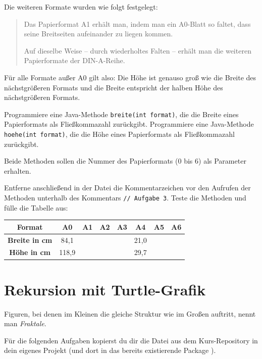 Die weiteren Formate wurden wie folgt festgelegt:

\begin{quotation}
\noindent Das Papierformat A1 erhält man, indem man ein A0-Blatt so faltet,
dass seine Breitseiten aufeinander zu liegen kommen.

\vspace{3mm}

\noindent Auf dieselbe Weise -- durch wiederholtes Falten -- erhält man die
weiteren Papierformate der DIN-A-Reihe.
\end{quotation}

Für alle Formate außer A0 gilt also: 
Die Höhe ist genauso groß wie die Breite des nächstgrößeren Formats und die
Breite entspricht der halben Höhe des nächstgrößeren Formats.

Programmiere eine Java-Methode \lstinline|breite(int format)|, die die Breite eines
Papierformats als Fließkommazahl zurückgibt. Programmiere eine Java-Methode
\lstinline|hoehe(int format)|, die die Höhe eines Papierformats als Fließkommazahl zurückgibt.

Beide Methoden sollen die Nummer des Papierformats ($0$ bis $6$) als Parameter
erhalten. 

Entferne anschließend in der Datei die Kommentarzeichen vor den Aufrufen der Methoden unterhalb des
Kommentars \glqq\lstinline|// Aufgabe 3|\grqq . Teste die Methoden und
fülle die Tabelle aus:

\bgroup
\def\arraystretch{1.2}
\begin{tabular}{|c|c|c|c|c|c|c|c|}\hline
\textbf{Format}       & \textbf{A0} & \textbf{A1} & \textbf{A2} & \textbf{A3} & \textbf{A4} & \textbf{A5} & \textbf{A6} \\ \hline
\textbf{Breite in cm} &  84,1 &  &  &  & 21,0 & & \\ \hline
\textbf{Höhe in cm}   & 118,9 &  &  &  & 29,7 & & \\ \hline
\end{tabular}
\egroup


\section{Rekursion mit Turtle-Grafik}

Figuren, bei denen im Kleinen die gleiche Struktur wie im Großen auftritt,
nennt man \emph{Fraktale}.

Für die folgenden Aufgaben kopierst du dir die Datei
 aus dem Kurs-Repository in dein eigenes Projekt (und
dort in das bereits existierende Package ).

